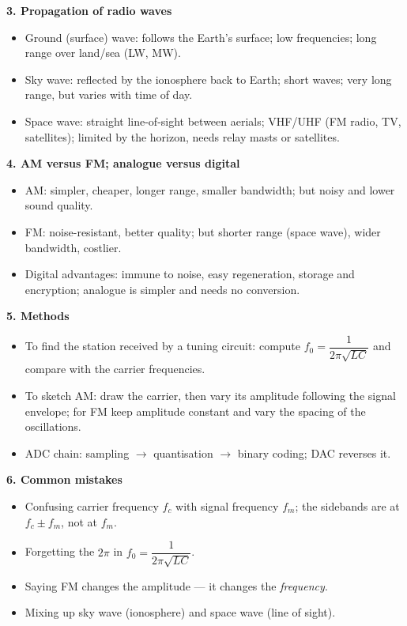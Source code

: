 \documentclass[11pt]{article}
\newcommand{\cle}[1]{{\popxbold\color{popdark}#1}}
\begin{document}
\begin{aretenir}
\textbf{3. Propagation of radio waves}
\begin{itemize}
  \item \cle{Ground (surface) wave}: follows the Earth's surface; low frequencies; long range over land/sea (LW, MW).
  \item \cle{Sky wave}: reflected by the ionosphere back to Earth; short waves; very long range, but varies with time of day.
  \item \cle{Space wave}: straight line-of-sight between aerials; VHF/UHF (FM radio, TV, satellites); limited by the horizon, needs relay masts or satellites.
\end{itemize}

\textbf{4. AM versus FM; analogue versus digital}
\begin{itemize}
  \item AM: simpler, cheaper, longer range, smaller bandwidth; but noisy and lower sound quality.
  \item FM: noise-resistant, better quality; but shorter range (space wave), wider bandwidth, costlier.
  \item Digital advantages: immune to noise, easy regeneration, storage and encryption; analogue is simpler and needs no conversion.
\end{itemize}

\textbf{5. Methods}
\begin{itemize}
  \item To find the station received by a tuning circuit: compute $f_0 = \dfrac{1}{2\pi\sqrt{LC}}$ and compare with the carrier frequencies.
  \item To sketch AM: draw the carrier, then vary its amplitude following the signal envelope; for FM keep amplitude constant and vary the spacing of the oscillations.
  \item ADC chain: sampling $\to$ quantisation $\to$ binary coding; DAC reverses it.
\end{itemize}

\textbf{6. Common mistakes}
\begin{itemize}
  \item Confusing carrier frequency $f_c$ with signal frequency $f_m$; the sidebands are at $f_c \pm f_m$, not at $f_m$.
  \item Forgetting the $2\pi$ in $f_0 = \dfrac{1}{2\pi\sqrt{LC}}$.
  \item Saying FM changes the amplitude --- it changes the \emph{frequency}.
  \item Mixing up sky wave (ionosphere) and space wave (line of sight).
\end{itemize}


\end{aretenir}
\end{document}
